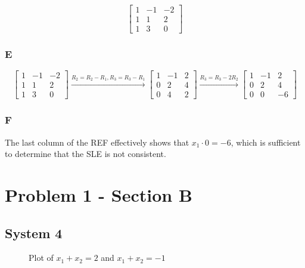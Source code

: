 \documentclass{article}
\begin{document}
\[
	\begin{bmatrix}
		1 & -1 & -2 \\
		1 & 1  & 2  \\
		1 & 3  & 0
	\end{bmatrix}
\]

\subsubsection*{E}

\[
	\begin{bmatrix}
		1 & -1 & -2 \\
		1 & 1  & 2  \\
		1 & 3  & 0
	\end{bmatrix}
	\xrightarrow{R_2 = R_2 - R_1 ,R_3 = R_3 - R_1}
	\begin{bmatrix}
		1 & -1 & 2 \\
		0 & 2  & 4 \\
		0 & 4  & 2
	\end{bmatrix}
	\xrightarrow{R_3 = R_3 - 2R_2}
	\begin{bmatrix}
		1 & -1 & 2  \\
		0 & 2  & 4  \\
		0 & 0  & -6
	\end{bmatrix}
\]

\subsubsection*{F}

The last column of the REF effectively shows that $x_1 \cdot 0 = -6$, which is sufficient to determine that the SLE is not consistent.

\section*{Problem 1 - Section B}

\subsection*{System 4}

\begin{figure}[h!]
	\centering
	\caption{Plot of $x_1 + x_2 = 2$ and $x_1 + x_2 = -1$}
	\label{fig:plot4}
\end{figure}
\end{document}
